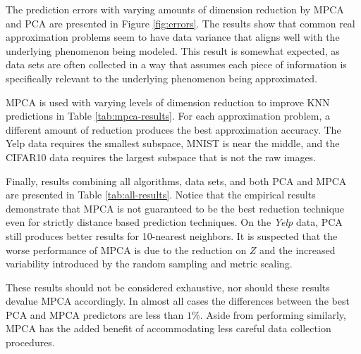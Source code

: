 \documentclass{scspaperproc}
\theoremstyle{scsthe}
\begin{document}
The prediction errors with varying amounts of dimension reduction by
MPCA and PCA are presented in Figure \ref{fig:errors}. The results
show that common real approximation problems seem to have data
variance that aligns well with the underlying phenomenon being
modeled. This result is somewhat expected, as data sets are often
collected in a way that assumes each piece of information is
specifically relevant to the underlying phenomenon being approximated.

MPCA is used with varying levels of dimension reduction to improve KNN
predictions in Table \ref{tab:mpca-results}. For each approximation
problem, a different amount of reduction produces the best
approximation accuracy. The Yelp data requires the smallest subspace,
MNIST is near the middle, and the CIFAR10 data requires the largest
subspace that is not the raw images.

Finally, results combining all algorithms, data sets, and both PCA and
MPCA are presented in Table \ref{tab:all-results}. Notice that the
empirical results demonstrate that MPCA is not guaranteed to be the
best reduction technique even for strictly distance based prediction
techniques. On the \textit{Yelp} data, PCA still produces better
results for 10-nearest neighbors. It is suspected that the worse
performance of MPCA is due to the reduction on $Z$ and the increased
variability introduced by the random sampling and metric scaling.

These results should not be considered exhaustive, nor should these
results devalue MPCA accordingly. In almost all cases the differences
between the best PCA and MPCA predictors are less than $1\%.$ Aside
from performing similarly, MPCA has the added benefit of accommodating
less careful data collection procedures.
\end{document}
